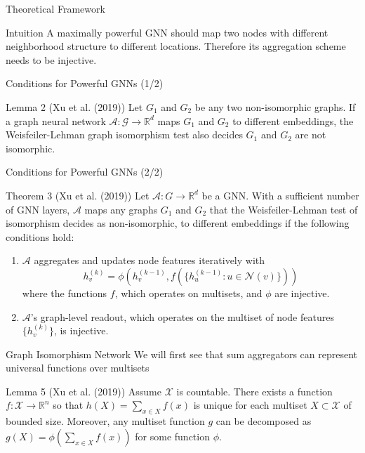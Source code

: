 \documentclass{beamer}
\theoremstyle{definition}
\newcommand{\A}{\mathcal{A}}
\begin{document}
\begin{frame}
\end{frame}


\begin{frame}{Theoretical Framework}
    \begin{block}{Intuition}
    A maximally powerful GNN should map two nodes with different neighborhood structure to different locations. Therefore its aggregation scheme needs to be injective.
    \end{block}
\end{frame}

\begin{frame}{Conditions for Powerful GNNs (1/2)}
    \begin{block}{Lemma 2 (Xu et al. (2019))}
    Let \(G_{1}\) and \(G_{2}\) be any two non-isomorphic graphs. If a graph neural network \(\A : \mathcal{G} \rightarrow \mathbb{R}^d\) maps \(G_{1}\) and \(G_{2}\) to different embeddings, the Weisfeiler-Lehman graph isomorphism test also decides \(G_{1}\) and \(G_{2}\) are not isomorphic.
    \end{block}
\end{frame}

\begin{frame}{Conditions for Powerful GNNs (2/2)}
    \begin{block}{Theorem 3 (Xu et al. (2019))}
    Let \(\A: G \rightarrow \mathbb{R}^d\) be a GNN. With a sufficient number of GNN layers, \(\A\) maps any graphs \(G_1\) and \(G_2\) that the Weisfeiler-Lehman test of isomorphism decides as non-isomorphic, to different embeddings if the following conditions hold:
    \begin{enumerate}
        \item \(\A\) aggregates and updates node features iteratively with
            \[
                h_v^{(k)} = \phi\left(h_v^{(k-1)},f\left(\Big\{h_u^{(k-1)}:u\in \mathcal{N}(v)\Big\}\right)\right)
            \]
            where the functions \(f\), which operates on multisets, and \(\phi\) are injective.
        \item \(\A\)’s graph-level readout, which operates on the multiset of node features \(\Big\{h_v^{(k)}\Big\}\), is injective.
    \end{enumerate}
    \end{block}
\end{frame}

\begin{frame}{Graph Isomorphism Network}
    We will first see that sum aggregators can represent universal functions over multisets
    \begin{block}{Lemma 5 (Xu et al. (2019))}
    Assume \(\mathcal{X}\) is countable. There exists a function \(f:\mathcal{X} \rightarrow \mathbb{R}^n\) so that \(h(X) = \sum_{x\in X} f(x)\) is unique for each multiset \(X \subset \mathcal{X}\) of bounded size.  Moreover, any multiset function \(g\) can be decomposed as \(g(X) = \phi\left(\sum_{x\in X}f(x)\right)\) for some function \(\phi\).
    \end{block}
\end{frame}
\end{document}
